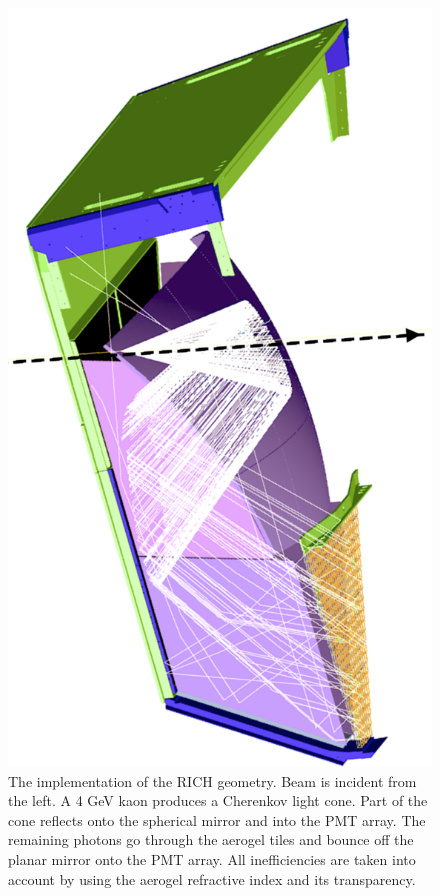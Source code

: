 \begin{figure}
	\centering
	\includegraphics[width=0.99\columnwidth, keepaspectratio]{img/richGeometry.png}
	\caption{The implementation of the RICH geometry. Beam is incident from the left. A 4 GeV kaon produces a
             Cherenkov light cone.
			 Part of the cone reflects onto the spherical mirror and into the PMT array. The remaining photons go
             through the aerogel tiles
			 and bounce off the planar mirror onto the PMT array. All inefficiencies are taken into account
             by using the aerogel refractive index
			 and its transparency. }
	\label{fig:richGeometry}
\end{figure}


